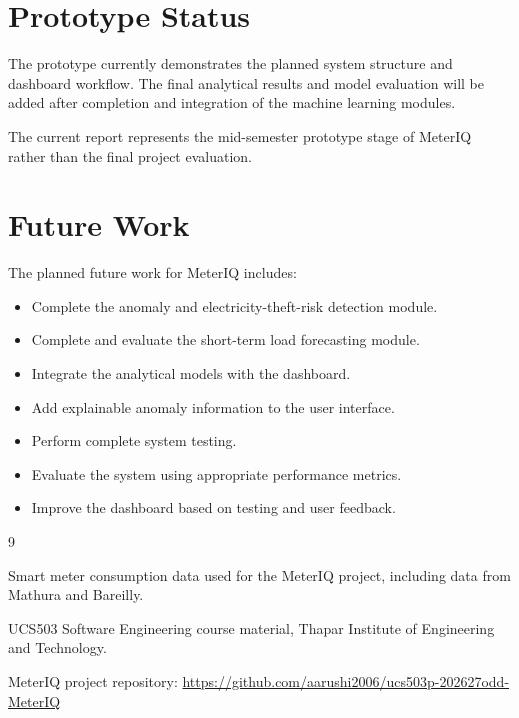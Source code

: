 \documentclass[12pt,a4paper]{report}
\begin{document}
\section{Prototype Status}

The prototype currently demonstrates the planned system structure and
dashboard workflow. The final analytical results and model evaluation will
be added after completion and integration of the machine learning modules.

The current report represents the mid-semester prototype stage of MeterIQ
rather than the final project evaluation.



\section{Future Work}

The planned future work for MeterIQ includes:

\begin{itemize}
    \item Complete the anomaly and electricity-theft-risk detection module.
    \item Complete and evaluate the short-term load forecasting module.
    \item Integrate the analytical models with the dashboard.
    \item Add explainable anomaly information to the user interface.
    \item Perform complete system testing.
    \item Evaluate the system using appropriate performance metrics.
    \item Improve the dashboard based on testing and user feedback.
\end{itemize}



\begin{thebibliography}{9}

Smart meter consumption data used for the MeterIQ project,
including data from Mathura and Bareilly.

UCS503 Software Engineering course material,
Thapar Institute of Engineering and Technology.

\raggedright
MeterIQ project repository:
\url{https://github.com/aarushi2006/ucs503p-202627odd-MeterIQ}

\end{thebibliography}


\end{document}
